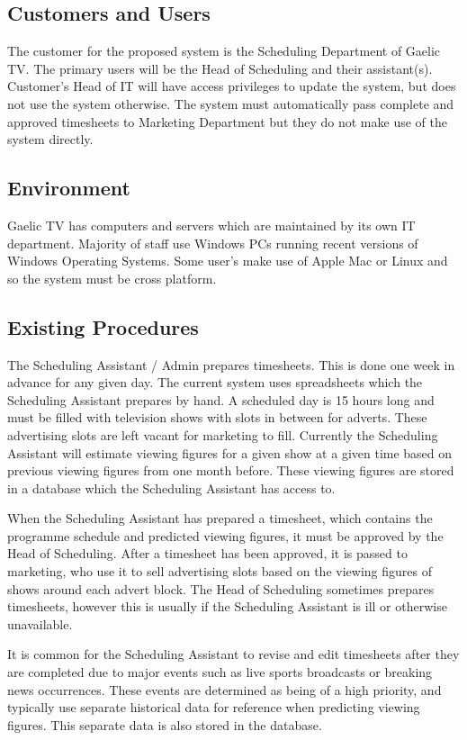 \documentclass[11pt, oneside]{article}
\begin{document}
\subsection{Customers and Users}
The customer for the proposed system is the Scheduling Department of Gaelic TV. The primary users will be the Head of Scheduling and their assistant(s). Customer's Head of IT will have access privileges to update the system, but does not use the system otherwise. The system must automatically pass complete and approved timesheets to Marketing Department but they do not make use of the system directly.
\subsection{Environment}
Gaelic TV has computers and servers which are maintained by its own IT department. Majority of staff use Windows PCs running recent versions of Windows Operating Systems. Some user's make use of Apple Mac or Linux and so the system must be cross platform.
\subsection{Existing Procedures}
The Scheduling Assistant / Admin prepares timesheets. This is done one week in advance for any given day. The current system uses spreadsheets which the Scheduling Assistant prepares by hand. A scheduled day is 15 hours long and must be filled with television shows with slots in between for adverts. These advertising slots are left vacant for marketing to fill. Currently the Scheduling Assistant will estimate viewing figures for a given show at a given time based on previous viewing figures from one month before. These viewing figures are stored in a database which the Scheduling Assistant has access to. 

When the Scheduling Assistant has prepared a timesheet, which contains the programme schedule and predicted viewing figures, it must be approved by the Head of Scheduling. After a timesheet has been approved, it is passed to marketing, who use it to sell advertising slots based on the viewing figures of shows around each advert block. The Head of Scheduling sometimes prepares timesheets, however this is usually if the Scheduling Assistant is ill or otherwise unavailable.

It is common for the Scheduling Assistant to revise and edit timesheets after they are completed due to major events such as live sports broadcasts or breaking news occurrences. These events are determined as being of a high priority, and typically use separate historical data for reference when predicting viewing figures. This separate data is also stored in the database.
\end{document}
